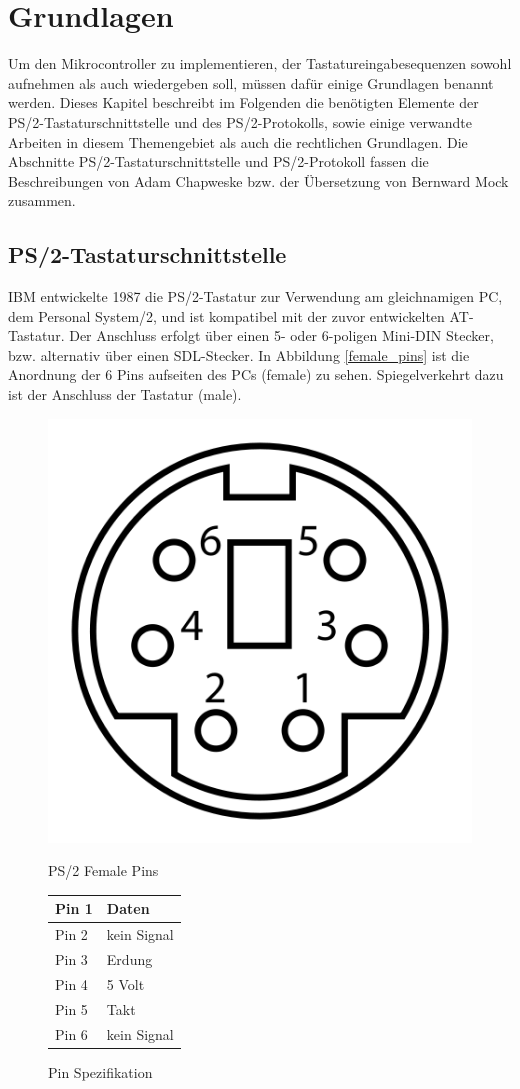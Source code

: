 \chapter{Grundlagen}
Um den Mikrocontroller zu implementieren, der Tastatureingabesequenzen sowohl aufnehmen als auch wiedergeben soll, müssen dafür einige Grundlagen benannt werden. Dieses Kapitel beschreibt im Folgenden die benötigten Elemente der PS/2-Tastaturschnittstelle und des PS/2-Protokolls, sowie einige verwandte Arbeiten in diesem Themengebiet als auch die rechtlichen Grundlagen. Die Abschnitte PS/2-Tastaturschnittstelle und PS/2-Protokoll fassen die Beschreibungen von Adam Chapweske \cite{chapweske} bzw. der Übersetzung von Bernward Mock \cite{mock} zusammen.



\section{PS/2-Tastaturschnittstelle}
IBM entwickelte 1987 die PS/2-Tastatur zur Verwendung am gleichnamigen PC, dem Personal System/2, und ist kompatibel mit der zuvor entwickelten AT-Tastatur. Der Anschluss erfolgt über einen 5- oder 6-poligen Mini-DIN Stecker, bzw. alternativ über einen SDL-Stecker. In Abbildung \ref{female_pins} \cite{female_pins} ist die Anordnung der 6 Pins aufseiten des PCs (female) zu sehen. Spiegelverkehrt dazu ist der Anschluss der Tastatur (male).

\begin{figure}
  \centering
  \begin{minipage}{0.45\textwidth}
    \centering
    \includegraphics[width=0.48\linewidth]{images/female_pins.png}
    \caption{PS/2 Female Pins}
    \label{female_pins}
  \end{minipage}
  \begin{minipage}{0.45\textwidth}
    \centering
    \begin{tabular}{|l|l|} \hline
      Pin 1 & Daten \\ \hline
      Pin 2 & kein Signal \\ \hline
      Pin 3 & Erdung \\ \hline
      Pin 4 & 5 Volt \\ \hline
      Pin 5 & Takt \\ \hline
      Pin 6 & kein Signal \\ \hline
    \end{tabular}
    \caption{Pin Spezifikation}
    \label{pin_specification}
  \end{minipage}
\end{figure}

